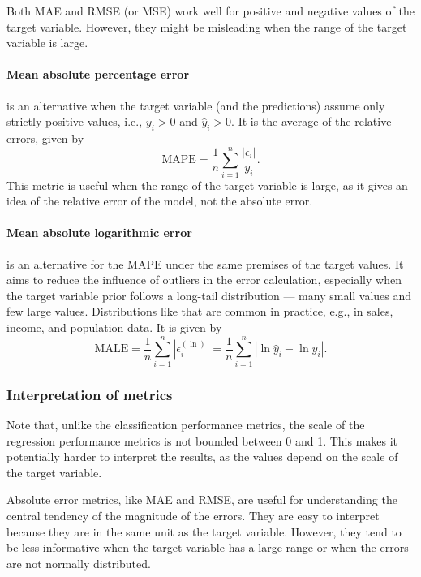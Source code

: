Both MAE and RMSE (or MSE) work well for positive and negative values of the target
variable.  However, they might be misleading when the range of the target variable is
large.

\paragraph{Mean absolute percentage error} is an alternative when the target variable (and
the predictions) assume only strictly positive values, i.e., $y_i > 0$ and $\hat{y}_i > 0$.
It is the average of the relative errors, given by
\begin{equation*}
  \text{MAPE} = \frac{1}{n} \sum_{i=1}^n \frac{|\epsilon_i|}{y_i}\text{.}
\end{equation*}
This metric is useful when the range of the target variable is large, as it gives an idea
of the relative error of the model, not the absolute error.

\paragraph{Mean absolute logarithmic error} is an alternative for the MAPE under the same
premises of the target values.  It aims to reduce the influence of outliers in the error
calculation, especially when the target variable prior follows a long-tail distribution
--- many small values and few large values.  Distributions like that are common in
practice, e.g., in sales, income, and population data.  It is given by
\begin{equation*}
  \text{MALE} = \frac{1}{n} \sum_{i=1}^n | \epsilon_i^{(\ln)} | =
    \frac{1}{n} \sum_{i=1}^n | \ln\hat{y}_i - \ln y_i |\text{.}
\end{equation*}

\subsubsection{Interpretation of metrics}

Note that, unlike the classification performance metrics, the scale of the regression
performance metrics is not bounded between 0 and 1.  This makes it potentially harder to interpret
the results, as the values depend on the scale of the target variable.

Absolute error metrics, like MAE and RMSE, are useful for understanding the central tendency
of the magnitude of the errors.  They are easy to interpret because they are in the same
unit as the target variable.  However, they tend to be less informative when the target
variable has a large range or when the errors are not normally distributed.

